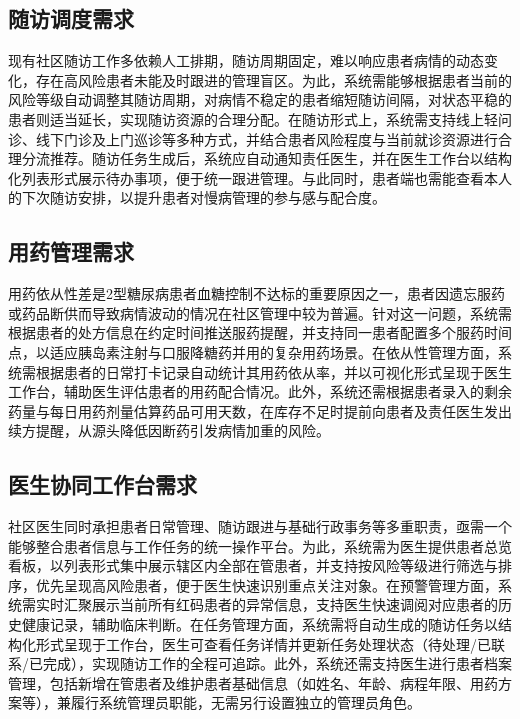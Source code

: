 \subsection{随访调度需求}

现有社区随访工作多依赖人工排期，随访周期固定，难以响应患者病情的动态变化，存在高风险患者未能及时跟进的管理盲区。为此，系统需能够根据患者当前的风险等级自动调整其随访周期，对病情不稳定的患者缩短随访间隔，对状态平稳的患者则适当延长，实现随访资源的合理分配。在随访形式上，系统需支持线上轻问诊、线下门诊及上门巡诊等多种方式，并结合患者风险程度与当前就诊资源进行合理分流推荐。随访任务生成后，系统应自动通知责任医生，并在医生工作台以结构化列表形式展示待办事项，便于统一跟进管理。与此同时，患者端也需能查看本人的下次随访安排，以提升患者对慢病管理的参与感与配合度。

\subsection{用药管理需求}

用药依从性差是2型糖尿病患者血糖控制不达标的重要原因之一，患者因遗忘服药或药品断供而导致病情波动的情况在社区管理中较为普遍。针对这一问题，系统需根据患者的处方信息在约定时间推送服药提醒，并支持同一患者配置多个服药时间点，以适应胰岛素注射与口服降糖药并用的复杂用药场景。在依从性管理方面，系统需根据患者的日常打卡记录自动统计其用药依从率，并以可视化形式呈现于医生工作台，辅助医生评估患者的用药配合情况。此外，系统还需根据患者录入的剩余药量与每日用药剂量估算药品可用天数，在库存不足时提前向患者及责任医生发出续方提醒，从源头降低因断药引发病情加重的风险。

\subsection{医生协同工作台需求}

社区医生同时承担患者日常管理、随访跟进与基础行政事务等多重职责，亟需一个能够整合患者信息与工作任务的统一操作平台。为此，系统需为医生提供患者总览看板，以列表形式集中展示辖区内全部在管患者，并支持按风险等级进行筛选与排序，优先呈现高风险患者，便于医生快速识别重点关注对象。在预警管理方面，系统需实时汇聚展示当前所有红码患者的异常信息，支持医生快速调阅对应患者的历史健康记录，辅助临床判断。在任务管理方面，系统需将自动生成的随访任务以结构化形式呈现于工作台，医生可查看任务详情并更新任务处理状态（待处理/已联系/已完成），实现随访工作的全程可追踪。此外，系统还需支持医生进行患者档案管理，包括新增在管患者及维护患者基础信息（如姓名、年龄、病程年限、用药方案等），兼履行系统管理员职能，无需另行设置独立的管理员角色。


